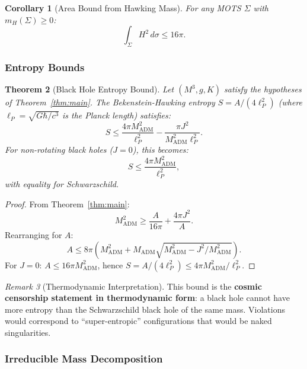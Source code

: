 \documentclass[12pt]{article}
\theoremstyle{plain}
\newtheorem{theorem}{Theorem}[section]
\newtheorem{corollary}[theorem]{Corollary}
\theoremstyle{definition}
\theoremstyle{remark}
\newtheorem{remark}[theorem]{Remark}
\newcommand{\ADM}{\mathrm{ADM}}
\begin{document}
\begin{corollary}[Area Bound from Hawking Mass]
For any MOTS $\Sigma$ with $m_H(\Sigma) \geq 0$:
\begin{equation}
    \int_\Sigma H^2 \, d\sigma \leq 16\pi.
\end{equation}
\end{corollary}

\subsubsection{Entropy Bounds}

\begin{theorem}[Black Hole Entropy Bound]\label{thm:entropy-bound}
Let $(M^3, g, K)$ satisfy the hypotheses of Theorem~\ref{thm:main}. The Bekenstein-Hawking entropy $S = A/(4\ell_P^2)$ (where $\ell_P = \sqrt{G\hbar/c^3}$ is the Planck length) satisfies:
\begin{equation}
    S \leq \frac{4\pi M_{\ADM}^2}{\ell_P^2} - \frac{\pi J^2}{M_{\ADM}^2 \ell_P^2}.
\end{equation}
For non-rotating black holes ($J = 0$), this becomes:
\begin{equation}
    S \leq \frac{4\pi M_{\ADM}^2}{\ell_P^2},
\end{equation}
with equality for Schwarzschild.
\end{theorem}

\begin{proof}
From Theorem~\ref{thm:main}:
\[
M_{\ADM}^2 \geq \frac{A}{16\pi} + \frac{4\pi J^2}{A}.
\]
Rearranging for $A$:
\[
A \leq 8\pi\left(M_{\ADM}^2 + M_{\ADM}\sqrt{M_{\ADM}^2 - J^2/M_{\ADM}^2}\right).
\]
For $J = 0$: $A \leq 16\pi M_{\ADM}^2$, hence $S = A/(4\ell_P^2) \leq 4\pi M_{\ADM}^2/\ell_P^2$.
\end{proof}

\begin{remark}[Thermodynamic Interpretation]
This bound is the \textbf{cosmic censorship statement in thermodynamic form}: a black hole cannot have more entropy than the Schwarzschild black hole of the same mass. Violations would correspond to ``super-entropic'' configurations that would be naked singularities.
\end{remark}

\subsubsection{Irreducible Mass Decomposition}
\end{document}
